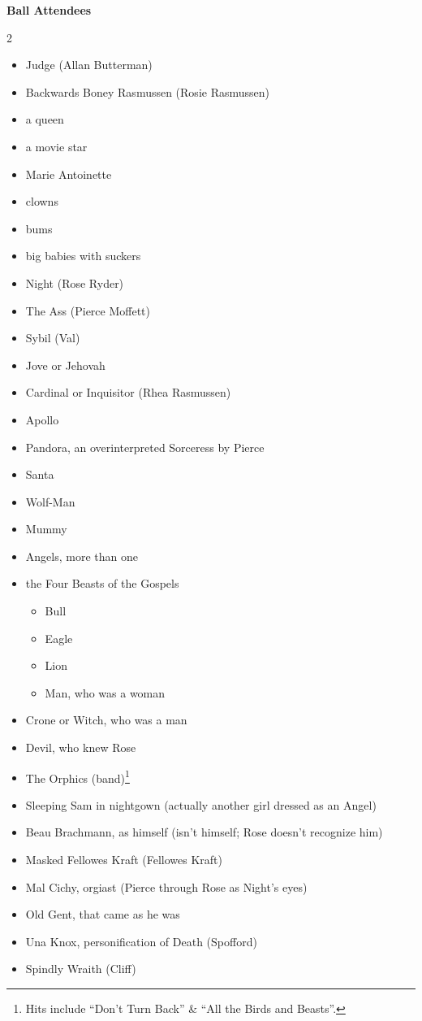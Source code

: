 \documentclass[10pt,makeidx]{extreport}
\begin{document}
\begin{tcolorbox}[breakout, title={Ball: Costumes \& Sightings}]
\textbf{\color{Mahogany}Ball Attendees}
\begin{multicols}{2}
\raggedright
\begin{itemize}[leftmargin=*, itemsep=2pt]
  \item Judge (Allan Butterman)
  \item Backwards Boney Rasmussen (Rosie Rasmussen)
  \item a queen
  \item a movie star
  \item Marie Antoinette
  \item clowns
  \item bums
  \item big babies with suckers
  \item Night (Rose Ryder)
  \item The Ass (Pierce Moffett)
  \item Sybil (Val)
  \item Jove or Jehovah
  \item Cardinal or Inquisitor (Rhea Rasmussen)
  \item Apollo
  \item Pandora, an overinterpreted Sorceress by Pierce
  \item Santa
  \item Wolf-Man
  \item Mummy
  \item Angels, more than one
  \item the Four Beasts of the Gospels
    \begin{itemize}[leftmargin=1.2em, itemsep=1pt]
      \item Bull
      \item Eagle
      \item Lion
      \item Man, who was a woman
    \end{itemize}
  \item Crone or Witch, who was a man
  \item Devil, who knew Rose
  \item The Orphics (band)\footnote{Hits include “Don't Turn Back” \& “All the Birds and Beasts”.}
  \item Sleeping Sam in nightgown (actually another girl dressed as an Angel)
  \item Beau Brachmann, as himself (isn’t himself; Rose doesn’t recognize him)
  \item Masked Fellowes Kraft (Fellowes Kraft)
  \item Mal Cichy, orgiast (Pierce through Rose as Night’s eyes)
  \item Old Gent, that came as he was
  \item Una Knox, personification of Death (Spofford)
  \item Spindly Wraith (Cliff)
\end{itemize}
\end{multicols}
\end{tcolorbox}
\end{document}
